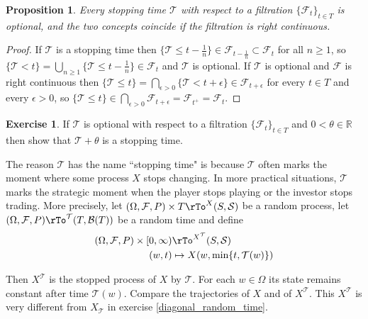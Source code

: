 \documentclass[12pt]{amsart}
\newtheorem{proposition}[theorem]{Proposition}
\theoremstyle{definition}
\newtheorem{exercise}[theorem]{Exercise}
\begin{document}
\begin{proposition} \label{stoppingtimeoptionaltime} Every stopping time $\mathcal{T}$ with respect to a filtration $\{\mathcal{F}_t\}_{t \in T}$ is optional, and the two concepts coincide if the filtration is right continuous.
\end{proposition}
\begin{proof} If $\mathcal{T}$ is a stopping time then $\{\mathcal{T} \leq t - \frac{1}{n}\} \in \mathcal{F}_{t - \frac{1}{n}} \subset \mathcal{F}_t$ for all $n \geq 1$, so $\{\mathcal{T} < t\} = \bigcup\limits_{n \geq 1} \{\mathcal{T} \leq t - \frac{1}{n}\} \in \mathcal{F}_t$ and $\mathcal{T}$ is optional. If $\mathcal{T}$ is optional and $\mathcal{F}$ is right continuous then $\{\mathcal{T} \leq t\} = \bigcap\limits_{\epsilon > 0}\{\mathcal{T} < t + \epsilon\} \in \mathcal{F}_{t + \epsilon}$ for every $t \in T$ and every $\epsilon > 0$, so $\{\mathcal{T} \leq t\} \in \bigcap\limits_{\epsilon > 0} \mathcal{F}_{t + \epsilon} = \mathcal{F}_{t^+} = \mathcal{F}_t$.
\end{proof}

\begin{exercise} If $\mathcal{T}$ is optional with respect to a filtration $\{\mathcal{F}_t\}_{t \in T}$ and $0 < \theta \in \mathbb{R}$ then show that $\mathcal{T} + \theta$ is a stopping time.
\end{exercise}

The reason $\mathcal{T}$ has the name ``stopping time" is because $\mathcal{T}$ often marks the moment where some process $X$ stops changing. In more practical situations, $\mathcal{T}$ marks the strategic moment when the player stops playing or the investor stops trading. More precisely, let $(\Omega, \mathcal{F}, P) \times T \rTo^X (S, \mathcal{S})$ be a random process, let $(\Omega, \mathcal{F}, P) \rTo^{\mathcal{T}} (T, \mathcal{B}(T))$ be a random time and define
\begin{align*}
(\Omega, \mathcal{F}, P) \times [0,\infty) & \rTo^{X^{\mathcal{T}}} (S, \mathcal{S}) \\
(w,t) & \mapsto X(w, \text{min}\{t, \mathcal{T}(w)\})
\end{align*}

Then $X^{\mathcal{T}}$ is the stopped process of $X$ by $\mathcal{T}$. For each $w \in \Omega$ its state remains constant after time $\mathcal{T}(w)$. Compare the trajectories of $X$ and of $X^{\mathcal{T}}$. This $X^{\mathcal{T}}$ is very different from $X_{\mathcal{T}}$ in exercise \ref{diagonal_random_time}.
\end{document}
